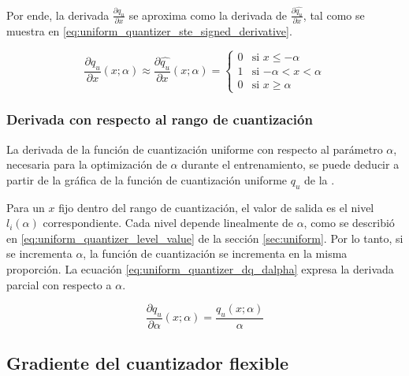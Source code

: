 \vspace{-0.5cm}

Por ende, la derivada $\frac{\partial q_u}{\partial x}$ se aproxima como la derivada de $\frac{\partial \hat{q_u}}{\partial x}$, tal como se muestra en \eqref{eq:uniform_quantizer_ste_signed_derivative}.

\begin{equation}
    \label{eq:uniform_quantizer_ste_signed_derivative}
    \frac{\partial q_u}{\partial x}\left(x; \alpha\right) \approx
    \frac{\partial \hat{q_u}}{\partial x}\left(x; \alpha\right) =
    \begin{cases}
        0 & \text{si $x \leq -\alpha$} \\
        1 & \text{si $-\alpha < x < \alpha$} \\
        0 & \text{si $x \geq \alpha$}
    \end{cases}
\end{equation}

\subsubsection{Derivada con respecto al rango de cuantización}

La derivada de la función de cuantización uniforme con respecto al parámetro $\alpha$, necesaria para la optimización de $\alpha$ durante el entrenamiento, se puede deducir a partir de la gráfica de la función de cuantización uniforme $q_u$ de la .

Para un $x$ fijo dentro del rango de cuantización, el valor de salida es el nivel $l_i(\alpha)$ correspondiente. Cada nivel depende linealmente de $\alpha$, como se describió en \eqref{eq:uniform_quantizer_level_value} de la sección \ref{sec:uniform}. Por lo tanto, si se incrementa $\alpha$, la función de cuantización se incrementa en la misma proporción. La ecuación \eqref{eq:uniform_quantizer_dq_dalpha} expresa la derivada parcial con respecto a $\alpha$.

\begin{equation}
    \label{eq:uniform_quantizer_dq_dalpha}
    \frac{\partial q_u}{\partial \alpha}\left(x; \alpha\right) = \frac{q_u(x; \alpha)}{\alpha}
\end{equation}

\subsection{Gradiente del cuantizador flexible}
\label{sec:flexible_quantizer_gradient}

